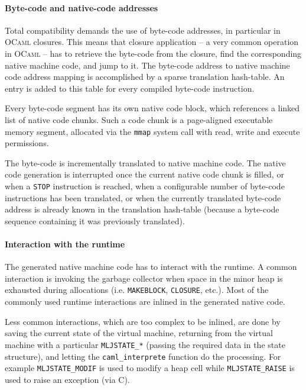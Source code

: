 \documentclass[10pt,a4paper,twocolumn]{article}
\begin{document}
\paragraph{Byte-code and native-code addresses}

Total compatibility demands the use of byte-code addresses, in particular in \textsc{OCaml}
closures. This means that closure application -- a very common operation in \textsc{OCaml} -- has
to retrieve the byte-code from the closure, find the corresponding native machine code, and jump to
it. The byte-code address to native machine code address mapping is accomplished by a sparse 
translation hash-table. An entry is added to this table for every compiled byte-code instruction.

Every byte-code segment has its own native code block, which references a linked list of native
code chunks. Such a code chunk is a page-aligned executable memory segment, allocated via the
\texttt{mmap} system call with read, write and execute permissions.

The byte-code is incrementally translated to native machine code. The native code generation is
interrupted once the current native code chunk is filled, or when a \texttt{STOP} instruction is
reached, when a configurable number of byte-code instructions has been translated, or when the
currently translated byte-code address is already known in the translation hash-table
(because a byte-code sequence containing it was previously translated).

\paragraph{Interaction with the runtime}

The generated native machine code has to interact with the runtime. A common interaction is
invoking the garbage collector when space in the minor heap is exhausted during allocations
(i.e. \texttt{MAKEBLOCK}, \texttt{CLOSURE}, etc.). Most of the commonly used runtime interactions
are inlined in the generated native code.

Less common interactions, which are too complex to be inlined, are done by saving the current
state of the virtual machine, returning from the virtual machine with a particular
\texttt{MLJSTATE\_*} (passing the required data in the state structure), and letting the
\texttt{caml\_interprete} function do the processing. For example \texttt{MLJSTATE\_MODIF} is
used to modify a heap cell while \texttt{MLJSTATE\_RAISE} is used to raise an exception (via C).
\end{document}
